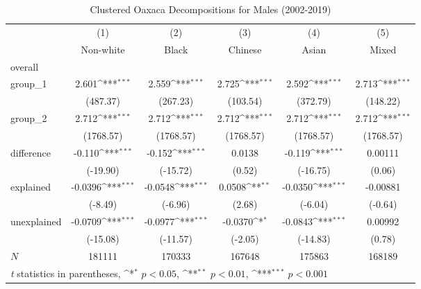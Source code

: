\begin{table}[htbp]\centering
\def\sym#1{\ifmmode^{#1}\else\(^{#1}\)\fi}
\caption{Clustered Oaxaca Decompositions for Males (2002-2019)\label{tab1}}
\begin{tabular}{l*{5}{c}}
\hline\hline
            &\multicolumn{1}{c}{(1)}&\multicolumn{1}{c}{(2)}&\multicolumn{1}{c}{(3)}&\multicolumn{1}{c}{(4)}&\multicolumn{1}{c}{(5)}\\
            &\multicolumn{1}{c}{Non-white}&\multicolumn{1}{c}{Black}&\multicolumn{1}{c}{Chinese}&\multicolumn{1}{c}{Asian}&\multicolumn{1}{c}{Mixed}\\
\hline
overall     &                     &                     &                     &                     &                     \\
group\_1     &       2.601\sym{***}&       2.559\sym{***}&       2.725\sym{***}&       2.592\sym{***}&       2.713\sym{***}\\
            &    (487.37)         &    (267.23)         &    (103.54)         &    (372.79)         &    (148.22)         \\
group\_2     &       2.712\sym{***}&       2.712\sym{***}&       2.712\sym{***}&       2.712\sym{***}&       2.712\sym{***}\\
            &   (1768.57)         &   (1768.57)         &   (1768.57)         &   (1768.57)         &   (1768.57)         \\
difference  &      -0.110\sym{***}&      -0.152\sym{***}&      0.0138         &      -0.119\sym{***}&     0.00111         \\
            &    (-19.90)         &    (-15.72)         &      (0.52)         &    (-16.75)         &      (0.06)         \\
explained   &     -0.0396\sym{***}&     -0.0548\sym{***}&      0.0508\sym{**} &     -0.0350\sym{***}&    -0.00881         \\
            &     (-8.49)         &     (-6.96)         &      (2.68)         &     (-6.04)         &     (-0.64)         \\
unexplained &     -0.0709\sym{***}&     -0.0977\sym{***}&     -0.0370\sym{*}  &     -0.0843\sym{***}&     0.00992         \\
            &    (-15.08)         &    (-11.57)         &     (-2.05)         &    (-14.83)         &      (0.78)         \\
\hline
\(N\)       &      181111         &      170333         &      167648         &      175863         &      168189         \\
\hline\hline
\multicolumn{6}{l}{\footnotesize \textit{t} statistics in parentheses, \sym{*} \(p<0.05\), \sym{**} \(p<0.01\), \sym{***} \(p<0.001\)}\\
\end{tabular}
\label{tab:oaxaca_male_clustered}
\end{table}
